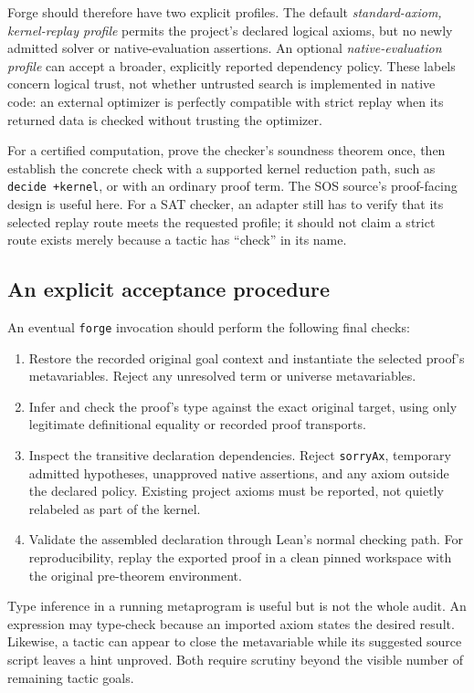 \documentclass[11pt,a4paper]{article}
\newcommand{\code}[1]{\texttt{#1}}
\begin{document}
Forge should therefore have two explicit profiles. The default
\emph{standard-axiom, kernel-replay profile} permits the project's declared
logical axioms, but no newly admitted solver or native-evaluation assertions.
An optional \emph{native-evaluation profile} can accept a broader, explicitly
reported dependency policy. These labels concern logical trust, not whether
untrusted search is implemented in native code: an external optimizer is
perfectly compatible with strict replay when its returned data is checked
without trusting the optimizer.

For a certified computation, prove the checker's soundness theorem once, then
establish the concrete check with a supported kernel reduction path, such as
\code{decide +kernel}, or with an ordinary proof term. The SOS source's
proof-facing design is useful here. For a SAT checker, an adapter still has to
verify that its selected replay route meets the requested profile; it should
not claim a strict route exists merely because a tactic has ``check'' in its
name.

\subsection{An explicit acceptance procedure}
An eventual \code{forge} invocation should perform the following final checks:
\begin{enumerate}
\item Restore the recorded original goal context and instantiate the selected
proof's metavariables. Reject any unresolved term or universe metavariables.
\item Infer and check the proof's type against the exact original target,
using only legitimate definitional equality or recorded proof transports.
\item Inspect the transitive declaration dependencies. Reject
\code{sorryAx}, temporary admitted hypotheses, unapproved native assertions,
and any axiom outside the declared policy. Existing project axioms must be
reported, not quietly relabeled as part of the kernel.
\item Validate the assembled declaration through Lean's normal checking path.
For reproducibility, replay the exported proof in a clean pinned workspace
with the original pre-theorem environment.
\end{enumerate}

Type inference in a running metaprogram is useful but is not the whole audit.
An expression may type-check because an imported axiom states the desired
result. Likewise, a tactic can appear to close the metavariable while its
suggested source script leaves a hint unproved. Both require scrutiny beyond
the visible number of remaining tactic goals.
\end{document}
